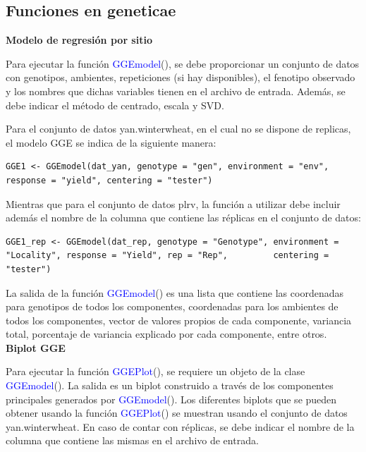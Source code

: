\subsection{Funciones en geneticae}

\textbf{Modelo de regresión por sitio}

Para ejecutar la función \textcolor{blue}{GGEmodel}(), se debe proporcionar un conjunto de datos con genotipos, ambientes, repeticiones (si hay disponibles), el fenotipo observado y los nombres que dichas variables tienen en el archivo de entrada. Además, se debe indicar el método de centrado, escala y SVD.

Para el conjunto de datos yan.winterwheat, en el cual no se dispone de replicas, el modelo GGE se indica de la siguiente manera:
		\begin{tcolorbox}[colframe=aurometalsaurus,colback=backcolour,colbacklower=white,
   				width=1\linewidth,
    			height=0.1\linewidth,
    			boxsep=-3mm]
			\begin{lstlisting}
GGE1 <- GGEmodel(dat_yan, genotype = "gen", environment = "env", response = "yield", centering = "tester")
			\end{lstlisting}
		\end{tcolorbox}
Mientras que para el conjunto de datos plrv, la función a utilizar debe incluir además el nombre de la columna que contiene las réplicas en el conjunto de datos:

		\begin{tcolorbox}[colframe=aurometalsaurus,colback=backcolour,colbacklower=white,
   				width=1\linewidth,
    			height=0.1\linewidth,
    			boxsep=-3mm]
			\begin{lstlisting}
GGE1_rep <- GGEmodel(dat_rep, genotype = "Genotype", environment = "Locality", response = "Yield", rep = "Rep", 		centering = "tester")
			\end{lstlisting}
		\end{tcolorbox}

La salida de la función \textcolor{blue}{GGEmodel}() es una lista que contiene las coordenadas para genotipos de todos los componentes, coordenadas para los ambientes de todos los componentes, vector de valores propios de cada componente, variancia total, porcentaje de variancia explicado por cada componente, entre otros.\\

\textbf{Biplot GGE}

Para ejecutar la función \textcolor{blue}{GGEPlot}(), se requiere un objeto de la clase \textcolor{blue}{GGEmodel}(). La salida es un biplot construido a través de los componentes principales generados por \textcolor{blue}{GGEmodel}().
Los diferentes biplots que se pueden obtener usando la función \textcolor{blue}{GGEPlot}() se muestran usando el conjunto de datos yan.winterwheat. En caso de contar con réplicas, se debe indicar el nombre de la columna que contiene las mismas en el archivo de entrada.

